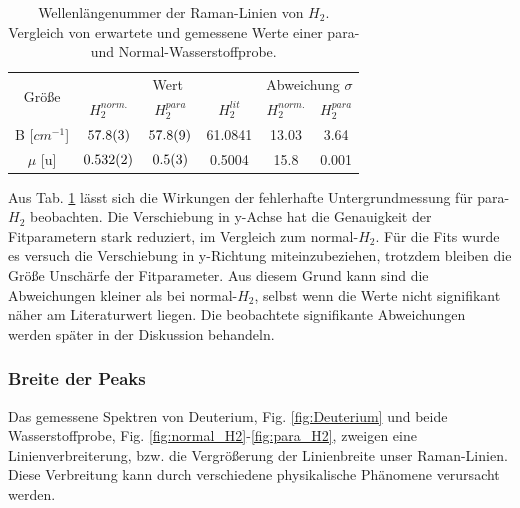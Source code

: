 \documentclass[11 pt]{article}
\begin{document}
\begin{table}[!htbp]
 \begin{center}
  \caption{\small Wellenlängenummer der Raman-Linien von $H_2$. Vergleich von erwartete und gemessene Werte einer para- und Normal-Wasserstoffprobe.}
  \label{tab:H2_B_mu}
  \renewcommand{\arraystretch}{1.3} %
  \begin{tabular}{|c|c|c|c|c|c|}
  \hline

\multirow{2}{*}{Größe}&\multicolumn{3}{c|}{Wert}& \multicolumn{2}{c|}{ Abweichung $\sigma$} \\ \cline{2-6} %
 					 &$H_2^{norm.}$	&	$H_2^{para}$ &  $H_2^{lit}$ &  $H_2^{norm.}$	&	$H_2^{para}$\\ 
  \hline
	\hline 
B [$\unit{cm^{-1}}$] & $\num{57.8\pm0.3}$ & $\num{57.8\pm0.9}$ & 61.0841 & 13.03 & 3.64 \\
$\mu$ [$\unit{\atomicmassunit}$] & $\num{0.532\pm0.002}$& $\num{0.5\pm0.3}$&0.5004 &15.8 & 0.001\\
	\hline
  \end{tabular}
  \renewcommand{\arraystretch}{1}
 \end{center}
\end{table}

Aus Tab. \ref{tab:H2_B_mu} lässt sich die Wirkungen der fehlerhafte Untergrundmessung für para-$H_2$ beobachten. Die Verschiebung in y-Achse hat die Genauigkeit der Fitparametern stark reduziert, im Vergleich zum normal-$H_2$. Für die Fits wurde es versuch die Verschiebung in y-Richtung miteinzubeziehen, trotzdem bleiben die Größe Unschärfe der Fitparameter. Aus diesem Grund kann sind die Abweichungen kleiner als bei normal-$H_2$, selbst wenn die Werte nicht signifikant näher am Literaturwert liegen. Die beobachtete signifikante Abweichungen werden später in der Diskussion behandeln. 



\subsubsection{Breite der Peaks}

Das gemessene Spektren von Deuterium, Fig. \ref{fig:Deuterium} und beide Wasserstoffprobe, Fig. \ref{fig:normal_H2}-\ref{fig:para_H2}, zweigen eine Linienverbreiterung, bzw. die Vergrößerung der Linienbreite unser Raman-Linien. Diese Verbreitung kann durch verschiedene physikalische Phänomene verursacht werden.
\end{document}
